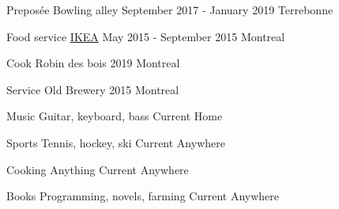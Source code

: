 



\begin{cvhonors}

  \cvhonor
    {Preposée} %
    {Bowling alley} %
    {September 2017 - January 2019} %
    {Terrebonne} %

  \cvhonor
    {Food service} %
    {\href{https://www.ikea.ca/}{IKEA}} %
    {May 2015 - September 2015} %
    {Montreal} %

\end{cvhonors}



\begin{cvhonors}
  \cvhonor
    {Cook} %
    {Robin des bois} %
    {2019} %
    {Montreal} %

  \cvhonor
    {Service} %
    {Old Brewery} %
    {2015} %
    {Montreal} %

\end{cvhonors}



\begin{cvhonors}
  \cvhonor
    {Music} %
    {Guitar, keyboard, bass} %
    {Current} %
    {Home} %

  \cvhonor
    {Sports} %
    {Tennis, hockey, ski} %
    {Current} %
    {Anywhere} %

  \cvhonor
    {Cooking} %
    {Anything} %
    {Current} %
    {Anywhere} %

  \cvhonor
    {Books} %
    {Programming, novels, farming} %
    {Current} %
    {Anywhere} %
\end{cvhonors}
